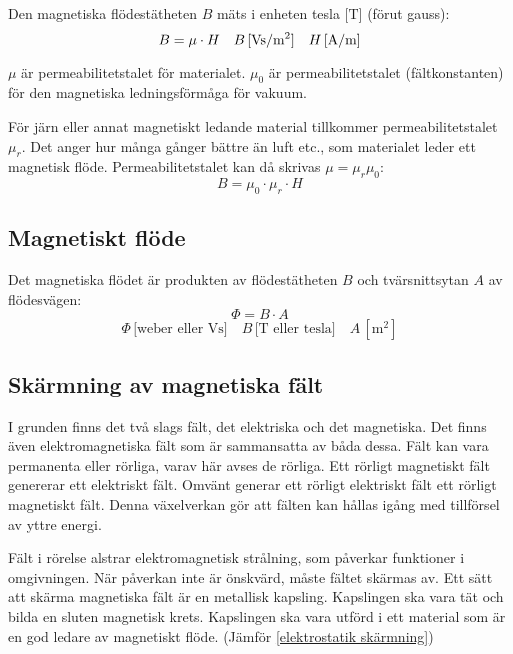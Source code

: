 Den magnetiska flödestätheten \(B\) mäts i enheten tesla \(\text{[T]}\) (förut gauss):
\[B = \mu \cdot H \quad B\, \text{[Vs/m$ ^2 $]}\quad H\, \text{[A/m]}\]

\(\mu\) är permeabilitetstalet för materialet.
\(\mu_0\) är permeabilitetstalet (fältkonstanten) för den magnetiska
ledningsförmåga för vakuum.

För järn eller annat magnetiskt ledande material tillkommer permeabilitetstalet
\(\mu_r\).
Det anger hur många gånger bättre än luft etc., som materialet leder ett
magnetisk flöde.
Permeabilitetstalet kan då skrivas
\(\mu = \mu_r\mu_0\):
\[B = \mu_0 \cdot \mu_r \cdot H\]
\subsection{Magnetiskt flöde}

Det magnetiska flödet är produkten av flödestätheten \(B\) och tvärsnittsytan
\(A\) av flödesvägen:
\[\Phi = B \cdot A\]
\[\Phi\, \text{[weber eller Vs]}\quad B\, \text{[T eller tesla]} \quad A\, [\text{m}^2]\]

\subsection{Skärmning av magnetiska fält}
\label{elektromagnetisk skärmning}

I grunden finns det två slags fält, det elektriska och det magnetiska. Det
finns även elektromagnetiska fält som är sammansatta av båda dessa.
Fält kan vara permanenta eller rörliga, varav här avses de rörliga.
Ett rörligt magnetiskt fält genererar ett elektriskt fält.
Omvänt generar ett rörligt elektriskt fält ett rörligt magnetiskt fält.
Denna växelverkan gör att fälten kan hållas igång med tillförsel av yttre
energi.

Fält i rörelse alstrar elektromagnetisk strålning, som påverkar funktioner i
omgivningen.
När påverkan inte är önskvärd, måste fältet skärmas av.
Ett sätt att skärma magnetiska fält är en metallisk kapsling.
Kapslingen ska vara tät och bilda en sluten magnetisk krets.
Kapslingen ska vara utförd i ett material som är en god ledare av magnetiskt
flöde.
(Jämför \ref{elektrostatik skärmning})
